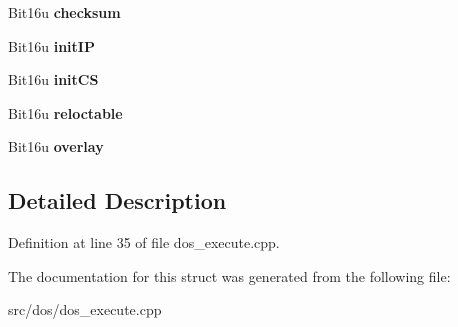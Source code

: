 \begin{DoxyCompactItemize}
\item 
\hypertarget{structEXE__Header_ac92fd91422490280ce5258f62faaab76}{Bit16u {\bfseries checksum}}\label{structEXE__Header_ac92fd91422490280ce5258f62faaab76}

\item 
\hypertarget{structEXE__Header_a5c3ed3060b5b9b052ba06b107dfff623}{Bit16u {\bfseries init\-I\-P}}\label{structEXE__Header_a5c3ed3060b5b9b052ba06b107dfff623}

\item 
\hypertarget{structEXE__Header_a8c7901f16c770425502568aa53e88b9f}{Bit16u {\bfseries init\-C\-S}}\label{structEXE__Header_a8c7901f16c770425502568aa53e88b9f}

\item 
\hypertarget{structEXE__Header_ac6cb2866806c535ec7629304594bfb19}{Bit16u {\bfseries reloctable}}\label{structEXE__Header_ac6cb2866806c535ec7629304594bfb19}

\item 
\hypertarget{structEXE__Header_a967bc5ab38661de13db00c705f40aa95}{Bit16u {\bfseries overlay}}\label{structEXE__Header_a967bc5ab38661de13db00c705f40aa95}

\end{DoxyCompactItemize}


\subsection{Detailed Description}


Definition at line 35 of file dos\-\_\-execute.\-cpp.



The documentation for this struct was generated from the following file\-:\begin{DoxyCompactItemize}
\item 
src/dos/dos\-\_\-execute.\-cpp\end{DoxyCompactItemize}
